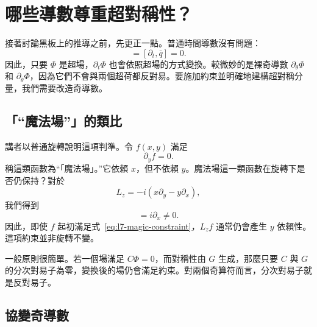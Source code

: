 \section{哪些導數尊重超對稱性？}

接著討論黑板上的推導之前，先更正一點。普通時間導數沒有問題：
\begin{equation}
[\partial_t,q]=[\partial_t,\bar q]=0.
\end{equation}
因此，只要 \(\Phi\) 是超場，\(\partial_t\Phi\) 也會依照超場的方式變換。較微妙的是裸奇導數 \(\partial_\theta\Phi\) 和 \(\partial_{\bar\theta}\Phi\)，因為它們不會與兩個超荷都反對易。要施加約束並明確地建構超對稱分量，我們需要改造奇導數。

\subsection{「``魔法場''」的類比}

講者以普通旋轉說明這項判準。令 \(f(x,y)\) 滿足
\begin{equation}
\partial_y f=0.
\label{eq:l7-magic-constraint}
\end{equation}
稱這類函數為``「魔法場」。''它依賴 \(x\)，但不依賴 \(y\)。魔法場這一類函數在旋轉下是否仍保持？對於
\begin{equation}
L_z=-i\left(x\partial_y-y\partial_x\right),
\end{equation}
我們得到
\begin{equation}
[\partial_y,L_z]=i\partial_x\neq0.
\end{equation}
因此，即使 \(f\) 起初滿足式~\eqref{eq:l7-magic-constraint}，\(L_z f\) 通常仍會產生 \(y\) 依賴性。這項約束並非旋轉不變。

一般原則很簡單。若一個場滿足 \(C\Phi=0\)，而對稱性由 \(G\) 生成，那麼只要 \(C\) 與 \(G\) 的分次對易子為零，變換後的場仍會滿足約束。對兩個奇算符而言，分次對易子就是反對易子。

\begin{classroomqa}
\end{classroomqa}

\subsection{協變奇導數}

